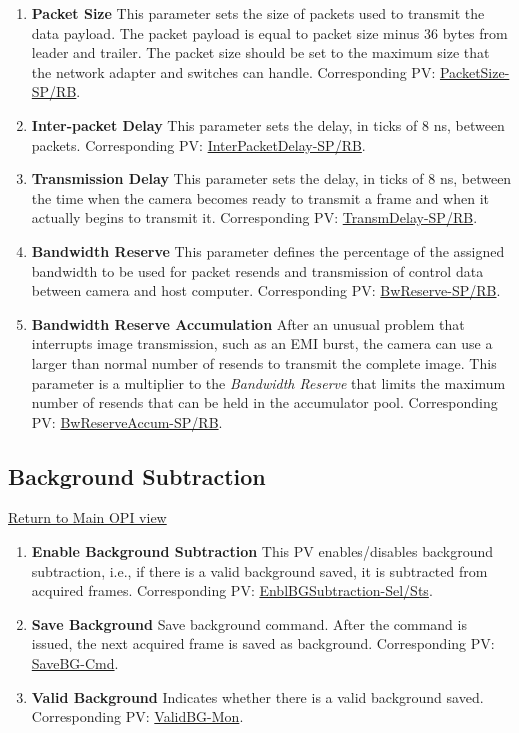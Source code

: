 \documentclass[openany]{article}
\begin{document}
\begin{enumerate}
            \item \textbf{Packet Size} This parameter sets the size of packets used to transmit the data payload. The packet payload is equal to packet size minus 36 bytes from leader and trailer. The packet size should be set to the maximum size that the network adapter and switches can handle. Corresponding PV: \hyperlink{pv:packet-size}{PacketSize-SP/RB}.
            \item \textbf{Inter-packet Delay} This parameter sets the delay, in ticks of 8 ns, between packets. Corresponding PV: \hyperlink{pv:inter-packet-delay}{InterPacketDelay-SP/RB}.
            \item \textbf{Transmission Delay} This parameter sets the delay, in ticks of 8 ns, between the time when the camera becomes ready to transmit a frame and when it actually begins to transmit it. Corresponding PV: \hyperlink{pv:transm-delay}{TransmDelay-SP/RB}.
            \item \textbf{Bandwidth Reserve} This parameter defines the percentage of the assigned bandwidth to be used for packet resends and transmission of control data between camera and host computer. Corresponding PV: \hyperlink{pv:bw-reserve}{BwReserve-SP/RB}.
            \item \textbf{Bandwidth Reserve Accumulation} After an unusual problem that interrupts image transmission, such as an EMI burst, the camera can use a larger than normal number of resends to transmit the complete image. This parameter is a multiplier to the \emph{Bandwidth Reserve} that limits the maximum number of resends that can be held in the accumulator pool. Corresponding PV: \hyperlink{pv:bw-reserve-accum}{BwReserveAccum-SP/RB}.
        \end{enumerate}

    \subsection{Background Subtraction}\label{sec:background-sub}

        \hyperref[fig:opi-main]{Return to Main OPI view}

        \begin{enumerate}
            \item \textbf{Enable Background Subtraction} This PV enables/disables background subtraction, i.e., if there is a valid background saved, it is subtracted from acquired frames. Corresponding PV: \hyperlink{pv:enbl-bg-subtraction}{EnblBGSubtraction-Sel/Sts}.
            \item \textbf{Save Background} Save background command. After the command is issued, the next acquired frame is saved as background. Corresponding PV: \hyperlink{pv:save-bg}{SaveBG-Cmd}.
            \item \textbf{Valid Background} Indicates whether there is a valid background saved. Corresponding PV: \hyperlink{pv:valid-bg}{ValidBG-Mon}.
        \end{enumerate}
\end{document}
